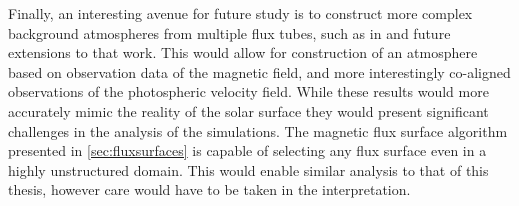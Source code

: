 Finally, an interesting avenue for future study is to construct more complex background atmospheres from multiple flux tubes, such as in \cite{gent2014} and future extensions to that work.
This would allow for construction of an atmosphere based on observation data of the magnetic field, and more interestingly co-aligned observations of the photospheric velocity field.
While these results would more accurately mimic the reality of the solar surface they would present significant challenges in the analysis of the simulations.
The magnetic flux surface algorithm presented in \cref{sec:fluxsurfaces} is capable of selecting any flux surface even in a highly unstructured domain.
This would enable similar analysis to that of this thesis, however care would have to be taken in the interpretation.
